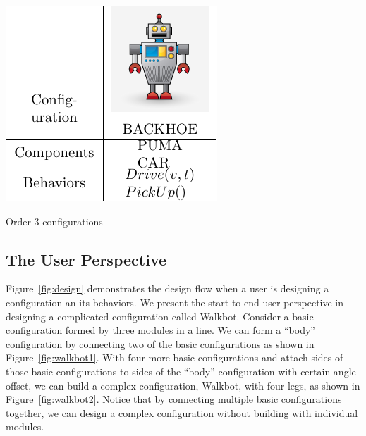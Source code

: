\documentclass[conference]{IEEEtran}
\theoremstyle{definition}
\begin{document}
\begin{table}
    \begin{center}
        \includegraphics[scale=1]{images/library/tier3.pdf}
        \caption{Order-3 configurations}
        \label{Order-3-configurations}
    \end{center}
\end{table}

\subsection{The User Perspective}
Figure~\ref{fig:design} demonstrates the design flow when a user is designing a configuration an its behaviors. We present the start-to-end user perspective in designing a complicated configuration called Walkbot. Consider a basic configuration formed by three modules in a line. We can form a ``body'' configuration by connecting two of the basic configurations as shown in Figure~\ref{fig:walkbot1}. With four more basic configurations and attach sides of those basic configurations to sides of the ``body'' configuration with certain angle offset, we can build a complex configuration, Walkbot, with four legs, as shown in Figure~\ref{fig:walkbot2}. Notice that by connecting multiple  basic configurations together, we can design a complex configuration without building with individual modules.
\end{document}
